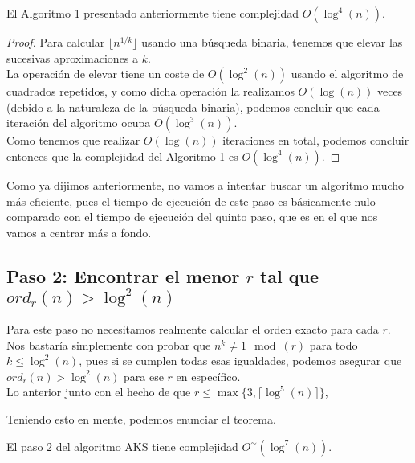 \begin{teorema}
	El Algoritmo 1 presentado anteriormente tiene complejidad $O(\log^4(n))$.
\end{teorema}

\begin{proof}
	Para calcular $\lfloor n^{1/k} \rfloor$ usando una búsqueda binaria, tenemos que elevar las sucesivas aproximaciones a $k$.\\
	
	La operación de elevar tiene un coste de $O(\log^2(n))$ usando el algoritmo de cuadrados repetidos, y como dicha operación la realizamos $O(\log(n))$ veces (debido a la naturaleza de la búsqueda binaria), podemos concluir que cada iteración del algoritmo ocupa $O(\log^3(n))$.\\
	
	Como tenemos que realizar $O(\log(n))$ iteraciones en total, podemos concluir entonces que la complejidad del Algoritmo 1 es $O(\log^4(n))$.
\end{proof}

Como ya dijimos anteriormente, no vamos a intentar buscar un algoritmo mucho más eficiente, pues el tiempo de ejecución de este paso es básicamente nulo comparado con el tiempo de ejecución del quinto paso, que es en el que nos vamos a centrar más a fondo.

\subsection{Paso 2: Encontrar el menor $r$ tal que $ord_r(n) > \log^2(n)$}

Para este paso no necesitamos realmente calcular el orden exacto para cada $r$. Nos bastaría simplemente con probar que $n^k \neq 1 \mod(r)$ para todo $k \leq \log^2(n)$, pues si se cumplen todas esas igualdades, podemos asegurar que $ord_r(n) > \log^2(n)$ para ese $r$ en específico.\\

Lo anterior junto con el hecho de que $r \leq \max\{3, \lceil \log^5(n) \rceil\}$,

Teniendo esto en mente, podemos enunciar el teorema.

\begin{teorema}
	El paso 2 del algoritmo AKS tiene complejidad $O^\sim(\log^7(n))$.
\end{teorema}

